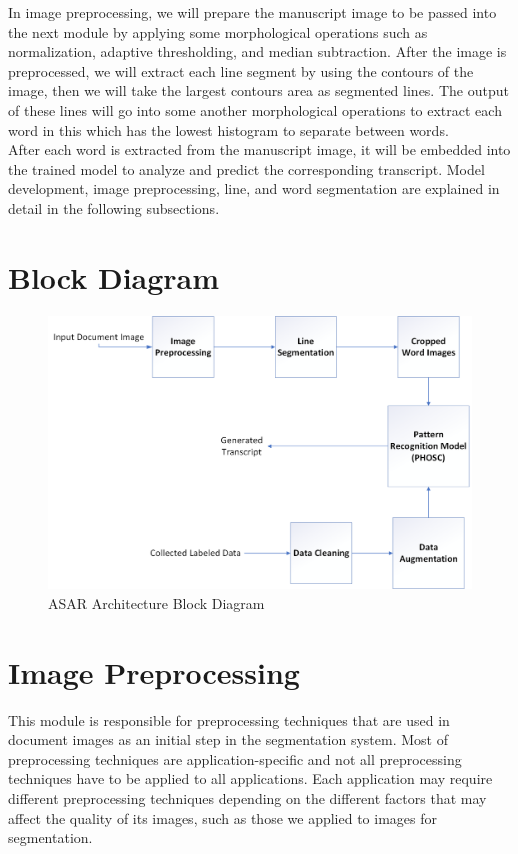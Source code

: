 \noindent
In image preprocessing, we will prepare the manuscript image to be passed into the next module by applying some morphological operations such as normalization, adaptive thresholding, and median subtraction. After the image is preprocessed, we will extract each line segment by using the contours of the image, then we will take the largest contours area as segmented lines. The output of these lines will go into some another morphological operations to extract each word in this which has the lowest histogram to separate between words. \\

\noindent
After each word is extracted from the manuscript image, it will be embedded into the trained model to analyze and predict the corresponding transcript. Model development, image preprocessing, line, and word segmentation are explained in detail in the following subsections.

\section{Block Diagram}

\begin{figure}[!htb]
    \centering
    \includegraphics[width=12cm]{images/block diagram.png}
    \caption{ASAR Architecture Block Diagram}
    \label{fig:block-digram}
\end{figure}

\section{Image Preprocessing}
This module is responsible for preprocessing techniques that are used in document images as an initial step in the segmentation system. Most of preprocessing techniques are application-specific and not all preprocessing techniques have to be applied to all applications. Each application may require different preprocessing techniques depending on the different factors that may affect the quality of its images, such as those we applied to images for segmentation.

